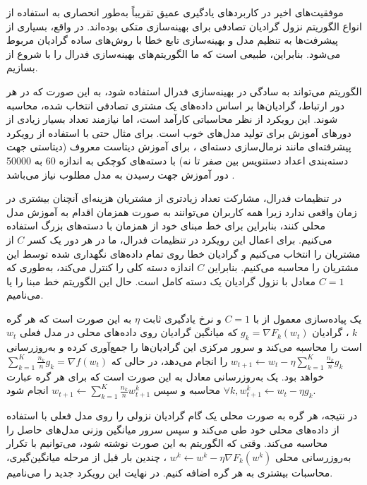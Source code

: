 موفقیت‌های اخیر در کاربردهای یادگیری عمیق تقریباً به‌طور انحصاری به استفاده از انواع الگوریتم نزول گرادیان تصادفی%
برای بهینه‌سازی متکی بوده‌اند. در واقع، بسیاری از پیشرفت‌ها به تنظیم مدل و بهینه‌سازی تابع خطا با روش‌های ساده گرادیان مربوط می‌شود. بنابراین، طبیعی است که ما الگوریتم‌های بهینه‌سازی فدرال را با شروع از
بسازیم.

الگوریتم
می‌تواند به سادگی در بهینه‌سازی فدرال استفاده شود، به این صورت که در هر دور ارتباط، گرادیان‌ها بر اساس داده‌های یک مشتری تصادفی انتخاب شده، محاسبه ‌شوند. این رویکرد از نظر محاسباتی کارآمد است، اما نیازمند تعداد بسیار زیادی از دورهای آموزش برای تولید مدل‌های خوب است.
برای مثال حتی با استفاده از رویکرد پیشرفته‌ای مانند نرمال‌سازی دسته‌ای%
%
، برای آموزش دیتاست معروف
(دیتاستی جهت دسته‌بندی اعداد دستنویس بین صفر تا نه)
با دسته‌های کوچکی به اندازه 60 به 50000 دور آموزش جهت رسیدن به مدل مطلوب نیاز می‌باشد
\cite{ioffe2015batch}.

در تنظیمات فدرال، مشارکت تعداد زیادتری از مشتریان هزینه‌ای آنچنان بیشتری در زمان واقعی ندارد زیرا همه کاربران می‌توانند به صورت همزمان اقدام به آموزش مدل محلی کنند، بنابراین برای خط مبنای خود از
همزمان با دسته‌های بزرگ استفاده می‌کنیم. برای اعمال این رویکرد در تنظیمات فدرال، ما در هر دور یک کسر
$C$
از مشتریان را انتخاب می‌کنیم و گرادیان خطا روی تمام داده‌های نگهداری شده توسط این مشتریان را محاسبه می‌کنیم. بنابراین
$C$
اندازه دسته‌ کلی را کنترل می‌کند، به‌طوری که
$C = 1$
معادل با نزول گرادیان یک دسته کامل است. حال این الگوریتم خط مبنا را
یا
می‌نامیم.

یک پیاده‌سازی معمول از
با
$C = 1$
و نرخ یادگیری ثابت
$\eta$
به این صورت است که هر گره
$k$%
، گرادیان
$g_k=\nabla F_k\left(w_t\right)$
که میانگین گرادیان روی داده‌های محلی در مدل فعلی
$w_t$
است را محاسبه می‌کند و سرور مرکزی این گرادیان‌ها را جمع‌آوری کرده و به‌روزرسانی
$w_{t+1} \leftarrow w_t-\eta \sum_{k=1}^K \frac{n_k}{n} g_k$
را انجام می‌دهد، در حالی که
$\sum_{k=1}^K \frac{n_k}{n} g_k=\nabla f\left(w_t\right)$
خواهد بود. یک به‌روزرسانی معادل به این صورت است که برای هر گره عبارت
$\forall k, w_{t+1}^k \leftarrow w_t-\eta g_k$
محاسبه و سپس
$w_{t+1} \leftarrow \sum_{k=1}^K \frac{n_k}{n} w_{t+1}^k$
انجام شود.

در نتیجه، هر گره به صورت محلی یک گام گرادیان نزولی را روی مدل فعلی با استفاده از داده‌های محلی خود طی می‌کند و سپس سرور میانگین وزنی مدل‌های حاصل را محاسبه می‌کند. وقتی که الگوریتم به این صورت نوشته شود، می‌توانیم با تکرار به‌روزرسانی محلی
$w^k \leftarrow w^k-\eta \nabla F_k\left(w^k\right)$%
، چندین بار قبل از مرحله میانگین‌گیری، محاسبات بیشتری به هر گره اضافه کنیم. در نهایت این رویکرد جدید را
می‌نامیم.

